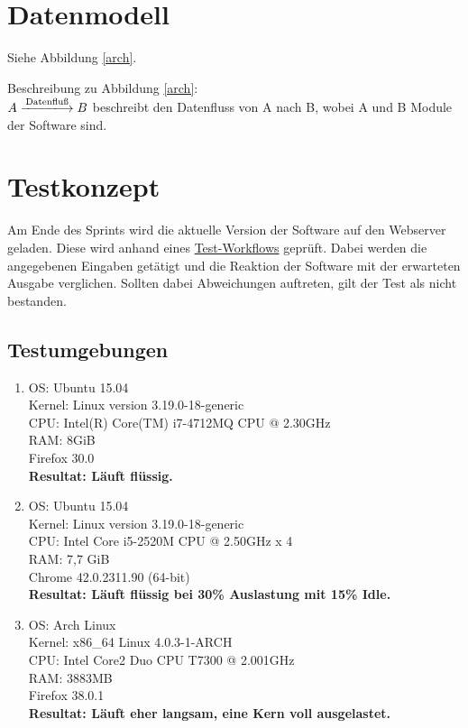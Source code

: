 \documentclass[11pt,a4paper]{article}
\begin{document}
\section{Datenmodell}

Siehe Abbildung \ref{arch}.\bigskip

Beschreibung zu Abbildung \ref{arch}: \\
$A \xlongrightarrow{\text{Datenfluß}} B $ beschreibt den Datenfluss von A nach B, wobei A und B Module der Software sind.


\section{Testkonzept}
Am Ende des Sprints wird die aktuelle Version der Software auf den Webserver geladen. Diese wird anhand eines \href{https://github.com/GKP15/pucman/wiki/Test-workflow}{Test-Workflows} geprüft. Dabei werden die angegebenen Eingaben getätigt und die Reaktion der Software mit der erwarteten Ausgabe verglichen. Sollten dabei Abweichungen auftreten, gilt der Test als nicht bestanden.
\subsection{Testumgebungen}
\begin{enumerate}
\item OS: Ubuntu 15.04 \\
Kernel: Linux version 3.19.0-18-generic \\
CPU: Intel(R) Core(TM) i7-4712MQ CPU @ 2.30GHz \\
RAM: 8GiB \\
Firefox 30.0 \\
\textbf{Resultat: Läuft flüssig.}
\item OS: Ubuntu 15.04\\
Kernel: Linux version 3.19.0-18-generic \\ 
CPU: Intel Core i5-2520M CPU @ 2.50GHz x 4 \\
RAM: 7,7 GiB \\
Chrome 42.0.2311.90 (64-bit) \\
\textbf{Resultat: Läuft flüssig bei 30\% Auslastung mit 15\% Idle.}
\item OS: Arch Linux \\
Kernel: x86\_64 Linux 4.0.3-1-ARCH \\
CPU: Intel Core2 Duo CPU T7300 @ 2.001GHz \\
RAM: 3883MB \\
Firefox 38.0.1 \\
\textbf{Resultat: Läuft eher langsam, eine Kern voll ausgelastet.}
\end{enumerate}
\end{document}
